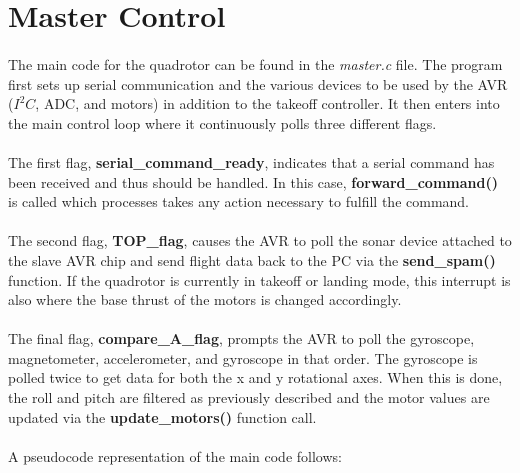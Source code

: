 \section{Master Control}

\paragraph{}
The main code for the quadrotor can be found in the {\it master.c} file.  The program first sets up serial communication and the various devices to be used by the AVR ($I^2C$, ADC, and motors) in addition to the takeoff controller.  It then enters into the main control loop where it continuously polls three different flags.  

\paragraph{}
The first flag, {\bf serial\_command\_ready}, indicates that a serial command has been received and thus should be handled.  In this case, {\bf forward\_command()} is called which processes takes any action necessary to fulfill the command.

\paragraph{}
The second flag, {\bf TOP\_flag}, causes the AVR to poll the sonar device attached to the slave AVR chip and send flight data back to the PC via the {\bf send\_spam()} function.  If the quadrotor is currently in takeoff or landing mode, this interrupt is also where the base thrust of the motors is changed accordingly.

\paragraph{}
The final flag, {\bf compare\_A\_flag}, prompts the AVR to poll the gyroscope, magnetometer, accelerometer, and gyroscope in that order.  The gyroscope is polled twice to get data for both the x and y rotational axes.  When this is done, the roll and pitch are filtered as previously described and the motor values are updated via the {\bf update\_motors()} function call.

\paragraph{}
A pseudocode representation of the main code follows:\\

